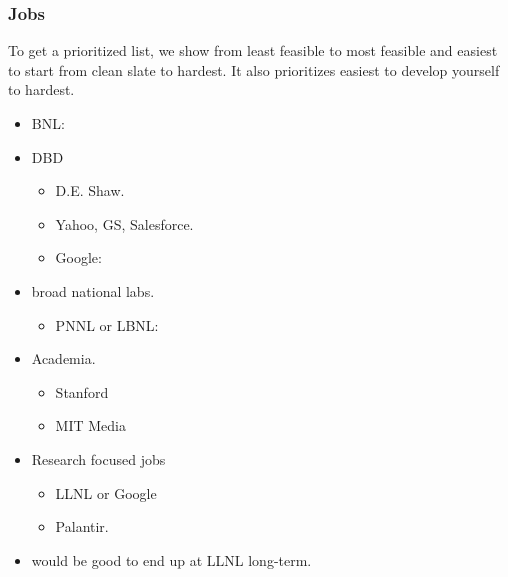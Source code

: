 \begin{frame}[label=jobsList]
\frametitle{Jobs} 
{\small To get a prioritized list, we show from least feasible to most
  feasible and easiest to start from clean slate to hardest. It also
  prioritizes easiest to develop yourself to hardest.} 

\begin{itemize}
\tiny \item \tiny BNL: 
\item \tiny DBD
\begin{itemize} 
\tiny \item \tiny D.E. Shaw. 
\item \tiny Yahoo, GS, Salesforce. 
\item \tiny Google: 
\end{itemize}
\item \tiny broad national labs. 
\begin{itemize}
\tiny  \item \tiny PNNL or LBNL: 
\end{itemize}
\item \tiny Academia.
\begin{itemize} 
\tiny \item \tiny Stanford 
\item \tiny MIT Media 
\end{itemize}
\item \tiny Research focused jobs 
\begin{itemize}
\tiny \item \tiny  LLNL or Google
\item \tiny Palantir. 
\end{itemize}
\end{itemize}

\begin{itemize}
\tiny \item \tiny would be good to end up at LLNL long-term. 
\end{itemize}
\end{frame}

